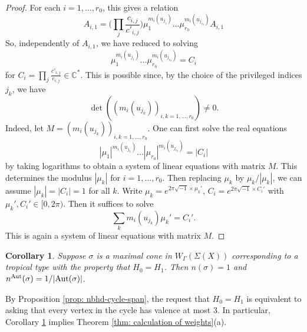 \documentclass{article}
\def\C{\mathbb{C}}
\def\Aut{{\rm Aut}}
\newtheorem{corollary}[definition]{Corollary}
\newcommand{\nn}{n^{\operatorname{Aut}}}
\begin{document}
\begin{proof}
    For each $i= 1, \ldots, r_0$, this gives a relation 
    $$A_{i,1} = \bigg(\prod_j \frac{c_{i,j}}{c'_{i,j}}\bigg) \mu_1^{m_i(u_{j_1})} \ldots \mu_{r_0}^{m_i(u_{j_{r_0}})}A_{i,1}$$
    So, independently of $A_{i,1}$, we have reduced to solving
    $$\mu_1^{m_i(u_{j_1})} \ldots \mu_{r_0}^{m_i(u_{j_{r_0}})} = C_i$$
    for $C_i = \prod_j \frac{c'_{i,j}}{c_{i,j}} \in \C^*$. This is possible since, by the choice of the privileged indices $j_k$, we have 
    $$\det((m_i(u_{j_k}))_{i,k= 1, \ldots, r_0}) \neq 0.$$ Indeed, let $M= (m_i(u_{j_k}))_{i,k= 1, \ldots, r_0}$. One can first solve the real equations
    $$|\mu_1|^{m_i(u_{j_1})} \ldots |\mu_{r_0}|^{m_i(u_{j_{r_0}})} = |C_i|$$
    by taking logarithms to obtain a system of linear equations with matrix $M$. This determines the modulus $|\mu_k|$ for $i=1,\ldots,r_0$. Then replacing $\mu_k$ by $\mu_k/|\mu_k|$, we can assume $|\mu_k| =|C_i| = 1$ for all $k$. Write $\mu_k = e^{2 \pi \sqrt{-1} \times \mu_k'} $, $C_i = e^{2\pi \sqrt{-1} \times C_i'}$ with $\mu_k' , C_i'\in [0,2 \pi)$. Then it suffices to solve
    $$\sum_k m_i(u_{j_k}) \mu_k' = C_i' .$$
    This is again a system of linear equations with matrix $M$.
\end{proof}

\begin{corollary} \label{cor: cyclespans}
    Suppose $\sigma$ is a maximal cone in $W_\Gamma(\Sigma(X))$ corresponding to a tropical type with the property that $H_0 = H_1$. Then $n(\sigma) = 1$ and  $\nn(\sigma) = 1/|\Aut(\sigma)|$. 
\end{corollary} 

By Proposition \ref{prop: nbhd-cycle-span}, the request that $H_0=H_1$ is equivalent to asking that every vertex in the cycle has valence at most $3$. In particular, Corollary \ref{cor: cyclespans} implies Theorem \ref{thm: calculation of weights}(a).
\end{document}
